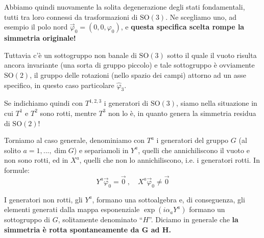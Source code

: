 \documentclass[../main.tex]{subfiles}
\begin{document}
\begin{example}
    Abbiamo quindi nuovamente la solita degenerazione degli stati fondamentali, tutti tra loro connessi da trasformazioni di $\textrm{SO}(3)$. Ne scegliamo uno, ad esempio il polo nord $\Vec{\varphi}_0 = (0,0,\varphi_0)$, e \textbf{questa specifica scelta rompe la simmetria originale!} 

    Tuttavia c'è un sottogruppo non banale di $\textrm{SO}(3)$ sotto il quale il vuoto risulta ancora invariante (una sorta di gruppo piccolo) e tale sottogruppo è ovviamente $\textrm{SO}(2)$, il gruppo delle rotazioni (nello spazio dei campi) attorno ad un asse specifico, in questo caso particolare $\hat{\varphi}_3$.

    Se indichiamo quindi con $T^{1,2,3}$ i generatori di $\textrm{SO}(3)$, siamo nella situazione in cui $T^{1}$ e $T^{2}$ sono rotti, mentre $T^{3}$ non lo è, in quanto genera la simmetria residua di $\textrm{SO}(2)$!
    \label{example:not_all_generators_broken}
\end{example}

Torniamo al caso generale, denominiamo con $T^a$ i generatori del gruppo $G$ (al solito $a=1,...,\dim G$) e separiamoli in $Y^a$, quelli che annichiliscono il vuoto e non sono rotti, ed in $X^a$, quelli che non lo annichiliscono, i.e. i generatori rotti. In formule:
\[
Y^a\Vec{\varphi}_0 = \Vec{0} ~,\quad X^a\Vec{\varphi}_0 \neq \Vec{0}
\]

I generatori non rotti, gli $Y^a$, formano una sottoalgebra e, di conseguenza, gli elementi generati dalla mappa esponenziale $\exp(i\alpha_aY^a)$ formano un sottogruppo di $G$, solitamente denominato “$H$”. Diciamo in generale che \textbf{la simmetria è rotta spontaneamente da $\mathbf{G}$ ad $\mathbf{H}$.}
\end{document}
